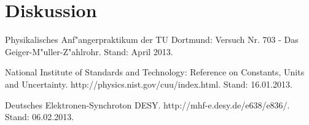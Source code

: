 \section{Diskussion}
	\label{diskussion}
	
\begin{thebibliography}{9}
	 Physikalisches Anf"angerpraktikum der TU Dortmund: Versuch Nr. 703 - Das Geiger-M"uller-Z"ahlrohr. Stand: April 2013.

	 National Institute of Standards and Technology: Reference on Constants, Units and Uncertainty. http://physics.nist.gov/cuu/index.html. Stand: 16.01.2013.

	 Deutsches Elektronen-Synchroton DESY. http://mhf-e.desy.de/e638/e836/. Stand: 06.02.2013.
\end{thebibliography}
